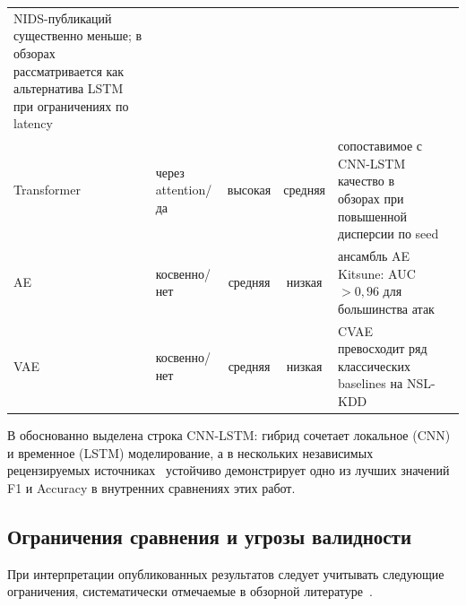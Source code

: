 \begin{table}[H]
\begin{tabularx}{\linewidth}{@{}lXccXl@{}}
NIDS-публикаций существенно меньше; в обзорах рассматривается как
альтернатива LSTM при ограничениях по latency &
\cite{bai2018tcn, ferrag2020dlcyber} \\
\addlinespace
Transformer & через attention/да & высокая & средняя &
сопоставимое с CNN-LSTM качество в обзорах при повышенной дисперсии по seed &
\cite{vaswani2017attention, ferrag2020dlcyber, ahmad2021nids} \\
\addlinespace
AE          & косвенно/нет  & средняя & низкая &
ансамбль AE Kitsune: AUC $> 0{,}96$ для большинства атак &
\cite{mirsky2018kitsune, andresini2021autoencoder} \\
\addlinespace
VAE         & косвенно/нет  & средняя & низкая &
CVAE превосходит ряд классических baselines на NSL-KDD &
\cite{lopez2017cvae, kingma2014vae} \\
\bottomrule
\end{tabularx}
\end{table}

В  обоснованно выделена строка
CNN-LSTM: гибрид сочетает локальное (CNN) и временное (LSTM) моделирование,
а в нескольких независимых рецензируемых
источниках~\cite{vinayakumar2019dl, ferrag2020dlcyber, liu2019survey,
ahmad2021nids} устойчиво демонстрирует одно из лучших значений F1 и
Accuracy в внутренних сравнениях этих работ.

\subsection{Ограничения сравнения и угрозы валидности}

При интерпретации опубликованных результатов следует учитывать следующие
ограничения, систематически отмечаемые в
обзорной литературе~\cite{khraisat2019survey, sommer2010outside,
pendlebury2019tesseract, gharib2016evalframework}.

